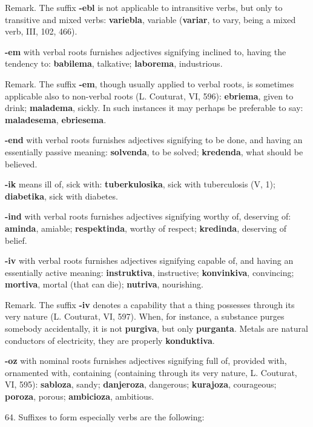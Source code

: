 \small Remark. The suffix \textbf{-ebl} is not applicable to intransitive verbs, but only to transitive and mixed verbs: \textbf{variebla}, variable (\textbf{variar}, to vary, being a mixed verb, III, 102, 466). \normalsize

\textbf{-em} with verbal roots furnishes adjectives signifying inclined to, having the tendency to: \textbf{babilema}, talkative; \textbf{laborema}, industrious.

\small Remark. The suffix \textbf{-em}, though usually applied to verbal roots, is sometimes applicable also to non-verbal roots (L. Couturat, VI, 596): \textbf{ebriema}, given to drink; \textbf{maladema}, sickly. In such instances it may perhaps be preferable to say: \textbf{maladesema}, \textbf{ebriesema}. \normalsize

\textbf{-end} with verbal roots furnishes adjectives signifying to be done, and having an essentially passive meaning: \textbf{solvenda}, to be solved; \textbf{kredenda}, what should be believed. 

\textbf{-ik} means ill of, sick with: \textbf{tuberkulosika}, sick with tuberculosis (V, 1); \textbf{diabetika}, sick with diabetes. 

\textbf{-ind} with verbal roots furnishes adjectives signifying worthy of, deserving of: \textbf{aminda}, amiable; \textbf{respektinda}, worthy of respect; \textbf{kredinda}, deserving of belief. 

\textbf{-iv} with verbal roots furnishes adjectives signifying capable of, and having an essentially active meaning: \textbf{instruktiva}, instructive; \textbf{konvinkiva}, convincing; \textbf{mortiva}, mortal (that can die); \textbf{nutriva}, nourishing. 

\small Remark. The suffix \textbf{-iv} denotes a capability that a thing possesses through its very nature (L. Couturat, VI, 597). When, for instance, a substance purges somebody accidentally, it is not \textbf{purgiva}, but only \textbf{purganta}. Metals are natural conductors of electricity, they are properly \textbf{konduktiva}. \normalsize

\textbf{-oz} with nominal roots furnishes adjectives signifying full of, provided with, ornamented with, containing (containing through its very nature, L. Couturat, VI, 595): \textbf{sabloza}, sandy; \textbf{danjeroza}, dangerous; \textbf{kurajoza}, courageous; \textbf{poroza}, porous; \textbf{ambicioza}, ambitious. 

64. Suffixes to form especially verbs are the following: 

